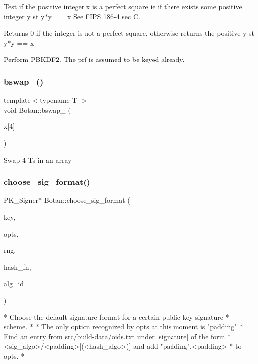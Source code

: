 Test if the positive integer x is a perfect square ie if there exists some positive integer y st y$\ast$y == x See F\+I\+PS 186-\/4 sec C. \begin{DoxyReturn}{Returns}
0 if the integer is not a perfect square, otherwise returns the positive y st y$\ast$y == x
\end{DoxyReturn}
Perform P\+B\+K\+D\+F2. The prf is assumed to be keyed already. \mbox{\label{namespace_botan_a5ec087b9959d7ffcbc195dcedbf10513}} 
\subsubsection{\texorpdfstring{bswap\+\_()}{bswap\_4()}}
{\footnotesize\ttfamily template$<$typename T $>$ \\
void Botan\+::bswap\+\_ (\begin{DoxyParamCaption}\item[{T}]{x\mbox{[}4\mbox{]} }\end{DoxyParamCaption})\hspace{0.3cm}{\ttfamily [inline]}}

Swap 4 Ts in an array \mbox{\label{namespace_botan_a6eb0cbf46c7168e09e5887efb25c3987}} 
\subsubsection{\texorpdfstring{choose\+\_\+sig\+\_\+format()}{choose\_sig\_format()}}
{\footnotesize\ttfamily P\+K\+\_\+\+Signer$\ast$ Botan\+::choose\+\_\+sig\+\_\+format (\begin{DoxyParamCaption}\item[{const Private\+\_\+\+Key \&}]{key,  }\item[{const std\+::map$<$ std\+::string, std\+::string $>$ \&}]{opts,  }\item[{Random\+Number\+Generator \&}]{rng,  }\item[{const std\+::string \&}]{hash\+\_\+fn,  }\item[{Algorithm\+Identifier \&}]{alg\+\_\+id }\end{DoxyParamCaption})}

\begin{DoxyVerb}* Choose the default signature format for a certain public key signature
* scheme.
*
* The only option recognized by opts at this moment is "padding"
* Find an entry from src/build-data/oids.txt under [signature] of the form
* <sig_algo>/<padding>[(<hash_algo>)] and add {"padding",<padding>}
* to opts.
* \end{DoxyVerb}



